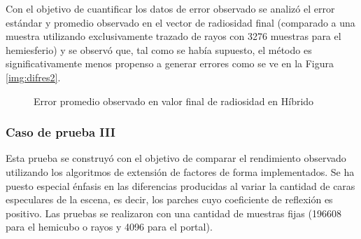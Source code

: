 Con el objetivo de cuantificar los datos de error observado se analizó el error estándar y promedio observado en el vector de radiosidad final (comparado a una muestra utilizando exclusivamente trazado de rayos con 3276 muestras para el hemiesferio) y se observó que, tal como se había supuesto, el método es significativamente menos propenso a generar errores como se ve en la Figura \ref{img:difres2}.

\begin{figure}
\caption{Error promedio observado en valor final de radiosidad en Híbrido}
\label{plot:errorcII}
\end{figure}
\subsubsection{Caso de prueba III}

Esta prueba se construyó con el objetivo de comparar el rendimiento observado utilizando los algoritmos de extensión de factores de forma implementados. Se ha puesto especial énfasis en las diferencias producidas al variar la cantidad de caras especulares de la escena, es decir, los parches cuyo coeficiente de reflexión es positivo. Las pruebas se realizaron con una cantidad de muestras fijas (196608 para el hemicubo o rayos y 4096 para el portal).

